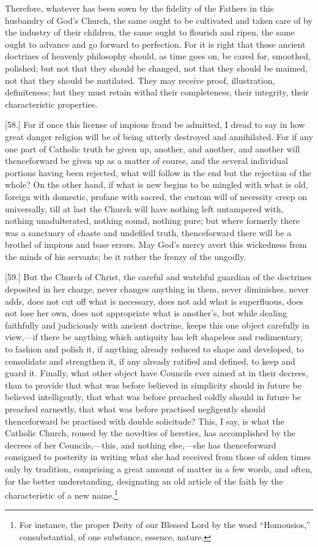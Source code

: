Therefore, whatever has been sown by the fidelity of the Fathers in this husbandry of God’s Church, the same ought to be cultivated and taken care of by the industry of their children, the same ought to flourish and ripen, the same ought to advance and go forward to perfection. For it is right that those ancient doctrines of heavenly philosophy should, as time goes on, be cared for, smoothed, polished; but not that they should be changed, not that they should be maimed, not that they should be mutilated. They may receive proof, illustration, definiteness; but they must retain withal their completeness, their integrity, their characteristic properties.

[58.] For if once this license of impious fraud be admitted, I dread to say in how great danger religion will be of being utterly destroyed and annihilated. For if any one part of Catholic truth be given up, another, and another, and another will thenceforward be given up as a matter of course, and the several individual portions having been rejected, what will follow in the end but the rejection of the whole? On the other hand, if what is new begins to be mingled with what is old, foreign with domestic, profane with sacred, the custom will of necessity creep on universally, till at last the Church will have nothing left untampered with, nothing unadulterated, nothing sound, nothing pure; but where formerly there was a sanctuary of chaste and undefiled truth, thenceforward there will be a brothel of impious and base errors. May God’s mercy avert this wickedness from the minds of his servants; be it rather the frenzy of the ungodly.

[59.] But the Church of Christ, the careful and watchful guardian of the doctrines deposited in her charge, never changes anything in them, never diminishes, never adds, does not cut off what is necessary, does not add what is superfluous, does not lose her own, does not appropriate what is another’s, but while dealing faithfully and judiciously with ancient doctrine, keeps this one object carefully in view,—if there be anything which antiquity has left shapeless and rudimentary, to fashion and polish it, if anything already reduced to shape and developed, to consolidate and strengthen it, if any already ratified and defined, to keep and guard it. Finally, what other object have Councils ever aimed at in their decrees, than to provide that what was before believed in simplicity should in future be believed intelligently, that what was before preached coldly should in future be preached earnestly, that what was before practised negligently should thenceforward be practised with double solicitude? This, I say, is what the Catholic Church, roused by the novelties of heretics, has accomplished by the decrees of her Councils,—this, and nothing else,—she has thenceforward consigned to posterity in writing what she had received from those of olden times only by tradition, comprising a great amount of matter in a few words, and often, for the better understanding, designating an old article of the faith by the characteristic of a new name.\footnote{For instance, the proper Deity of our Blessed Lord by the word “Homousios,” consubstantial, of one substance, essence, nature.}

